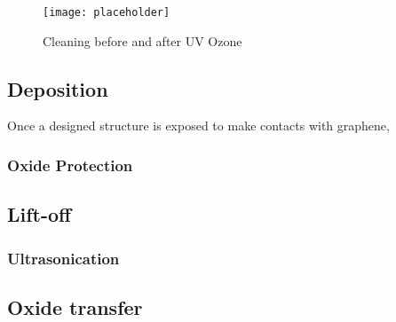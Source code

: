 \documentclass[../../Matt_Gebert_Honours_Thesis.tex]{subfiles}
\begin{document}
	\begin{figure}[H]
		\centering
		\texttt{[image: placeholder]}
		\caption{Cleaning before and after UV Ozone}\label{fig:UV_ozone}
	\end{figure}
	
	\subsection{Deposition}\label{sec:deposition}
	Once a designed structure is exposed to make contacts with graphene, 
	
	\subsubsection{Oxide Protection}\label{sec:deposition_oxide_protection}
	
	\subsection{Lift-off}\label{}
	\subsubsection{Ultrasonication}
	
	\subsection{Oxide transfer}
	
\end{document}
